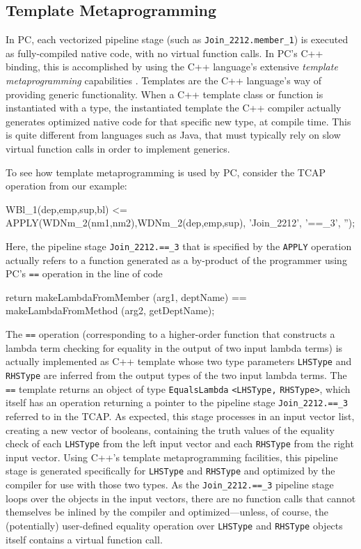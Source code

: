 \subsection{Template Metaprogramming}

In PC,
each vectorized pipeline stage (such as \texttt{Join\_2212.member\_1}) is executed as fully-compiled native code, with no virtual function
calls.
In PC's C++ binding, this is accomplished by using the C++ language's extensive \emph{template metaprogramming} 
capabilities \cite{josuttis2012c++}.  Templates are the C++ language's way of providing generic functionality.
When a C++ template class or
function is instantiated with a type, the instantiated template 
the C++ compiler actually generates optimized native code for that specific new type, at compile time.  
This is quite different from languages
such as Java, that must typically rely on slow virtual
function calls in order to implement generics.

To see how template metaprogramming is used by PC, consider
the TCAP operation from our example:

\begin{codesmall}
WBl_1(dep,emp,sup,bl) <= 
   APPLY(WDNm_2(nm1,nm2),WDNm_2(dep,emp,sup), 'Join_2212', '==_3', '');
\end{codesmall}

\noindent
Here, the pipeline stage \texttt{Join\_2212.==\_3} that is specified by the \texttt{APPLY} operation
actually refers to a function generated as a by-product of the
programmer using PC's \texttt{==} operation
in the line of code

\begin{codesmall} 
	return makeLambdaFromMember (arg1, deptName) == 
	       makeLambdaFromMethod (arg2, getDeptName); 
\end{codesmall}

\noindent The \texttt{==} 
operation (corresponding to a higher-order function that
constructs a lambda term checking for equality in the output of two input lambda terms) is actually implemented as C++ template
whose two type parameters \texttt{LHSType} and \texttt{RHSType} are inferred from
the output types of the two input lambda terms. 
The \texttt{==} template returns an object of type \texttt{EqualsLambda} \texttt{<LHSType,} \texttt{RHSType>}, which
itself has an operation returning a pointer to the pipeline stage \texttt{Join\_2212.==\_3} referred to in the TCAP.
As expected, this stage processes in an input vector list,
creating a new vector of booleans, containing the truth values of the equality check of each \texttt{LHSType} from the left
input vector and each \texttt{RHSType} from the right input vector.
Using C++'s template metaprogramming facilities, this 
pipeline stage is generated specifically for \texttt{LHSType} and \texttt{RHSType} and optimized by the compiler for use with those
two types.  
As the \texttt{Join\_2212.==\_3} pipeline stage loops over the objects in the input vectors, 
there are no function calls that cannot themselves be inlined by the compiler
and optimized---unless, of course, the (potentially) user-defined equality operation over \texttt{LHSType} and \texttt{RHSType}
objects itself contains a virtual function call.

